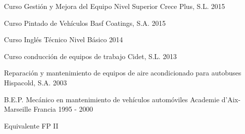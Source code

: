 

\begin{cventries}

  \cventry
    {Curso Gestión y Mejora del Equipo Nivel Superior} %
    {Crece Plus, S.L.} %
    {} %
    {2015} %
    {}

  \cventry
    {Curso Pintado de Vehículos} %
    {Basf Coatings, S.A.} %
    {} %
    {2015} %
    {}

  \cventry
    {Curso Inglés Técnico Nivel Básico} %
    {} %
    {} %
    {2014} %
    {}

  \cventry
    {Curso conducción de equipos de trabajo} %
    {Cidet, S.L.} %
    {} %
    {2013} %
    {}

  \cventry
    {Reparación y mantenimiento de equipos de aire acondicionado para autobuses} %
    {Hispacold, S.A.} %
    {} %
    {2003} %
    {}

  \cventry
    {B.E.P. Mecánico en mantenimiento de vehículos automóviles} %
    {Academie d’Aix-Marseille} %
    {Francia} %
    {1995 - 2000} %
    {
      \begin{cvitems} %
        \item {Equivalente FP II}
      \end{cvitems}
    }

\end{cventries}
